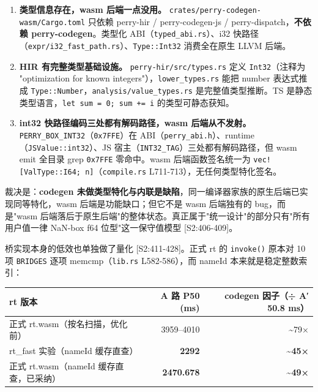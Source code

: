 \documentclass[11pt, a4paper]{article}
\begin{document}
\begin{enumerate}
\item \textbf{类型信息存在，wasm 后端一点没用。} \texttt{crates/perry-codegen-wasm/Cargo.toml} 只依赖 perry-hir / perry-codegen-js / perry-dispatch，\textbf{不依赖 perry-codegen}。类型化 ABI（\texttt{typed\_abi.rs}）、i32 快路径（\texttt{expr/i32\_fast\_path.rs}）、\texttt{Type::Int32} 消费全在原生 LLVM 后端。
\item \textbf{HIR 有完整类型基础设施。} \texttt{perry-hir/src/types.rs} 定义 \texttt{Int32}（注释为 "optimization for known integers"），\texttt{lower\_types.rs} 能把 number 表达式推成 \texttt{Type::Number}，\texttt{analysis/value\_types.rs} 是完整值类型推断。TS 是静态类型语言，\texttt{let sum = 0; sum += i} 的类型可静态获知。
\item \textbf{int32 快路径编码三处都有解码路径，wasm 后端从不发射。} \texttt{PERRY\_BOX\_INT32}（\texttt{0x7FFE}）在 ABI（\texttt{perry\_abi.h}）、runtime（\texttt{JSValue::int32}）、JS 宿主（\texttt{INT32\_TAG}）三处都有解码路径，但 wasm emit 全目录 grep \texttt{0x7FFE} 零命中。wasm 后端函数签名统一为 \texttt{vec![ValType::I64; n]}（\texttt{compile.rs} L711-713），无任何类型特化签名。
\end{enumerate}

裁决是：\textbf{codegen 未做类型特化与内联是缺陷}，同一编译器家族的原生后端已实现同等特化，wasm 后端是功能缺口；但它不是 wasm 后端独有的 bug，而是"wasm 后端落后于原生后端"的整体状态。真正属于"统一设计"的部分只有"所有用户值一律 NaN-box f64 位型"这一保守值模型 [S2:406-409]。


桥实现本身的低效也单独做了量化 [S2:411-428]。正式 rt 的 \texttt{invoke()} 原本对 10 项 \texttt{BRIDGES} 逐项 memcmp（\texttt{lib.rs} L582-586），而 nameId 本来就是稳定整数索引：


\begin{center}\small\begin{tabular}{lrr}
\toprule
rt 版本 & A 路 P50 (ms) & codegen 因子（÷ A′ 50.8 ms） \\
\midrule
正式 rt.wasm（按名扫描，优化前） & 3959–4010 & \textasciitilde{}79× \\
rt\_fast 实验（nameId 缓存直查） & \textbf{2292} & \textbf{\textasciitilde{}45×} \\
正式 rt.wasm（nameId 缓存直查，已采纳） & \textbf{2470.678} & \textbf{\textasciitilde{}49×} \\
\bottomrule
\end{tabular}\end{center}
\end{document}
